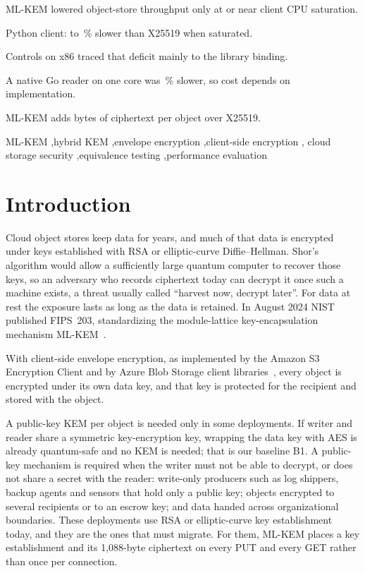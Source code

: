 \documentclass[review,12pt]{elsarticle}
\begin{document}
\begin{frontmatter}
\begin{highlights}
\item ML-KEM lowered object-store throughput only at or near client CPU saturation.
\item Python client: \RevHotDeficit{} to \ArmHotDeficit\,\% slower than X25519 when saturated.
\item Controls on x86 traced that deficit mainly to the library binding.
\item A native Go reader on one core was \AudNOneMlkemDeficit\,\% slower, so cost depends on implementation.
\item ML-KEM adds \RevMetaIntrinsic{} bytes of ciphertext per object over X25519.
\end{highlights}

\begin{keyword}
ML-KEM \sep hybrid KEM \sep envelope encryption \sep client-side encryption \sep
cloud storage security \sep equivalence testing \sep performance evaluation
\end{keyword}

\end{frontmatter}

\section{Introduction}
Cloud object stores keep data for years, and much of that data is encrypted under keys
established with RSA or elliptic-curve Diffie--Hellman. Shor's algorithm would allow a
sufficiently large quantum computer to recover those keys, so an adversary who records
ciphertext today can decrypt it once such a machine exists, a threat usually called
``harvest now, decrypt later''. For data at rest the exposure lasts as long as the data is
retained. In August 2024 NIST published FIPS~203, standardizing the module-lattice
key-encapsulation mechanism ML-KEM~\cite{fips203}.

With client-side envelope encryption, as implemented by the Amazon S3 Encryption Client and by
Azure Blob Storage client libraries~\cite{s3ec,azurecse}, every object is encrypted under its own
data key, and that key is protected for the recipient and stored with the object.

A public-key KEM per object is needed only in some deployments. If writer and reader share a symmetric
key-encryption key, wrapping the data key with AES is already quantum-safe and no KEM is needed;
that is our baseline B1. A public-key mechanism is required when the writer must not be able to
decrypt, or does not share a secret with the reader: write-only producers such as log shippers,
backup agents and sensors that hold only a public key; objects encrypted to several recipients
or to an escrow key; and data handed across organizational boundaries. These deployments use RSA
or elliptic-curve key establishment today, and they are the ones that must migrate. For them,
ML-KEM places a key establishment and its 1{,}088-byte ciphertext on every PUT and every GET
rather than once per connection.
\end{document}
